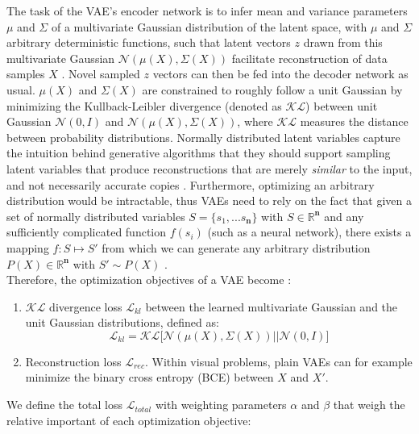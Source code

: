 \documentclass[twocolumn]{article}
\providecommand{\tightlist}{%
  \setlength{\itemsep}{0pt}\setlength{\parskip}{0pt}}
\begin{document}
The task of the VAE's encoder network is to infer mean and
variance parameters $\mu$ and $\Sigma$ of a multivariate Gaussian distribution of the latent space, with \(\mu\) and \(\Sigma\) arbitrary deterministic functions, such that latent vectors
\(z\) drawn from this multivariate Gaussian \(\mathcal{N}(\mu(X), \Sigma(X))\) facilitate reconstruction of data samples \(X\)
\citep{doersch2016tutorial}. Novel sampled \(z\) vectors can then be fed
into the decoder network as usual. \(\mu(X)\) and \(\Sigma(X)\) are
constrained to roughly follow a unit Gaussian by minimizing the
Kullback-Leibler divergence (denoted as \(\mathcal{KL}\)) between unit Gaussian
\(\mathcal{N}(0, I)\) and
\(\mathcal{N}(\mu(X), \Sigma(X))\), where
\(\mathcal{KL}\) measures the distance between probability
distributions. Normally distributed latent variables capture the
intuition behind generative algorithms that they should support sampling
latent variables that produce reconstructions that are merely
\emph{similar} to the input, and not necessarily accurate copies \citep{doersch2016tutorial}.
Furthermore, optimizing an arbitrary distribution would be intractable,
thus VAEs need to rely on the fact that given a set of normally
distributed variables \(S = \{s_1, ... s_\mathbf{n}\}\) with
\(S \in \mathbb{R}^{\mathbf{n}}\) and any sufficiently complicated
function \(f(s_i)\) (such as a neural network), there exists a mapping
\(f: S \mapsto S'\) from which we can generate any arbitrary
distribution \(P(X) \in \mathbb{R}^{\mathbf{n}}\) with \(S' \sim P(X)\)
\citep{doersch2016tutorial}. \\

\noindent Therefore, the optimization objectives of a VAE become \citep{doersch2016tutorial}:

\begin{enumerate}[topsep=2pt]
\def\labelenumi{\arabic{enumi}.}
\tightlist 
\item \(\mathcal{KL}\) divergence loss \(\mathcal{L}_{kl}\) between the learned multivariate Gaussian and the unit Gaussian distributions, defined as:
  \[\mathcal{L}_{kl} = \mathcal{KL}\lbrack\mathcal{N}(\mu(X), \Sigma(X)) \vert\vert \mathcal{N}(0, I)\rbrack\]
\item
 Reconstruction loss \(\mathcal{L}_{rec}\). Within visual problems, plain VAEs can for
  example minimize the binary cross entropy (BCE) between \(X\) and
  \(X'\).
\end{enumerate}

\noindent We define the total loss \(\mathcal{L}_{total}\) with weighting parameters \(\alpha\) and \(\beta\) that weigh the relative important of each optimization objective:
\end{document}
